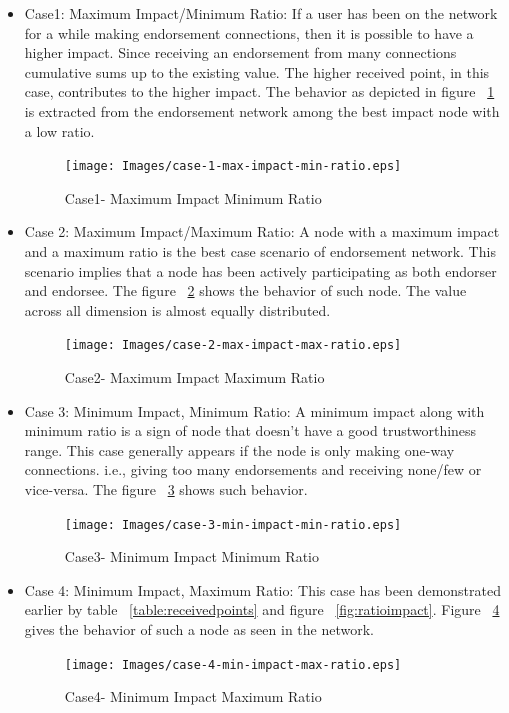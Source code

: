\begin{itemize}
	\item Case1: Maximum Impact/Minimum Ratio: If a user has been on the network
		for a while making endorsement connections, then it is possible to have
		a higher impact. Since receiving an endorsement from many connections
		cumulative sums up to the existing value. The higher received point, in
		this case, contributes to the higher impact. The behavior as depicted
		in figure ~\ref{fig:case1} is extracted from the endorsement network among
		the best impact node with a low ratio. 
	\begin{figure}[h]
		\texttt{[image: Images/case-1-max-impact-min-ratio.eps]}
		\caption{Case1- Maximum Impact Minimum Ratio}
		\label{fig:case1}
	\end{figure}
	\item Case 2: Maximum Impact/Maximum Ratio: A node with a maximum impact
		and a maximum ratio is the best case scenario of endorsement network.
		This scenario implies that a node has been actively participating as
		both endorser and endorsee. The figure ~\ref{fig:case2} shows the
		behavior of such node. The value across all dimension is almost equally
		distributed.  
	\begin{figure}[h]
		\texttt{[image: Images/case-2-max-impact-max-ratio.eps]}
		\caption{Case2- Maximum Impact Maximum Ratio}
		\label{fig:case2}
	\end{figure}
	\item Case 3: Minimum Impact, Minimum Ratio: A minimum impact along with
		minimum ratio is a sign of node that doesn't have a good
		trustworthiness range. This case generally appears if the node is only
		making one-way connections. i.e., giving too many endorsements and
		receiving none/few or vice-versa. The figure ~\ref{fig:case3} shows
		such behavior. 
	\begin{figure}[h]
		\texttt{[image: Images/case-3-min-impact-min-ratio.eps]}
		\caption{Case3- Minimum Impact Minimum Ratio}
		\label{fig:case3}
	\end{figure}
	\item Case 4: Minimum Impact, Maximum Ratio: This case has been
		demonstrated earlier by table ~\ref{table:receivedpoints} and figure
		~\ref{fig:ratioimpact}. Figure ~\ref{fig:case4} gives the behavior of
		such a node as seen in the network.
	\begin{figure}
		\texttt{[image: Images/case-4-min-impact-max-ratio.eps]}
		\caption{Case4- Minimum Impact Maximum Ratio}
		\label{fig:case4}
	\end{figure}
\end{itemize}


